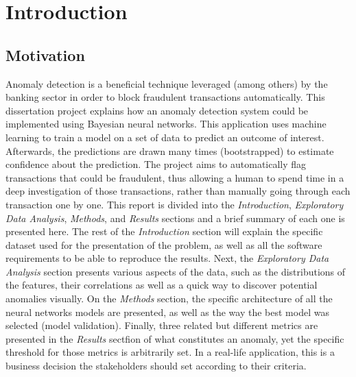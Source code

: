 \documentclass[11pt,twoside]{article}
\numberwithin{Theorem}{section}
\numberwithin{Definition}{section}
\numberwithin{Lemma}{section}
\numberwithin{Algorithm}{section}
\numberwithin{equation}{section}
\begin{document}
\pagestyle{plain}
\setcounter{page}{1}

\tableofcontents
\clearpage
\listoftables
\listoffigures
\cleardoublepage

\setcounter{page}{1}

\nocite{*}

\clearpage

\section{Introduction}
\subsection{Motivation}
\label{sec:motivation}
Anomaly detection is a beneficial technique leveraged (among others) by the banking sector in order to block fraudulent transactions automatically. This dissertation project explains how an anomaly detection system could be implemented using Bayesian neural networks. This application uses machine learning to train a model on a set of data to predict an outcome of interest. Afterwards, the predictions are drawn many times (bootstrapped) to estimate confidence about the prediction. The project aims to automatically flag transactions that could be fraudulent, thus allowing a human to spend time in a deep investigation of those transactions, rather than manually going through each transaction one by one.
This report is divided into the \textit{Introduction}, \textit{Exploratory Data Analysis}, \textit{Methods}, and \textit{Results} sections and a brief summary of each one is presented here. The rest of the \textit{Introduction} section will explain the specific dataset used for the presentation of the problem, as well as all the software requirements to be able to reproduce the results. Next, the \textit{Exploratory Data Analysis} section presents various aspects of the data, such as the distributions of the features, their correlations as well as a quick way to discover potential anomalies visually. On the \textit{Methods} section, the specific architecture of all the neural networks models are presented, as well as the way the best model was selected (model validation). Finally, three related but different metrics are presented in the \textit{Results} sectfion of what constitutes an anomaly, yet the specific threshold for those metrics is arbitrarily set. In a real-life application, this is a business decision the stakeholders should set according to their criteria.
\end{document}
